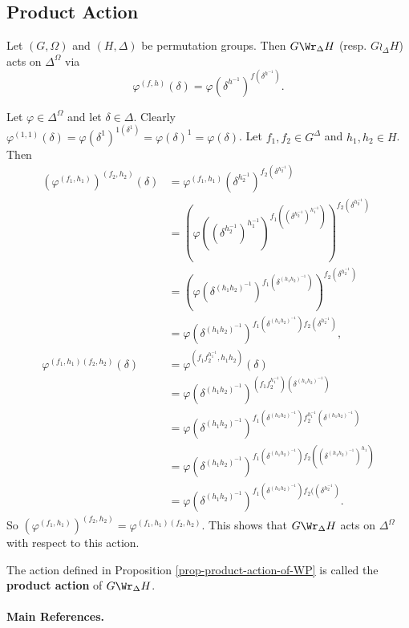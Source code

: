 \subsection{Product Action}
\begin{proposition} \label{prop-product-action-of-WP}
	Let $(G,\Omega)$ and $(H,\Delta)$ be permutation groups. Then $G\Wr_\Delta H$ (resp. $G\wr_\Delta H$) acts on $\Delta^\Omega$ via
	\begin{equation*}
	\varphi^{(f,h)}(\delta) = \varphi(\delta^{h^{-1}})^{f(\delta^{h^{-1}})}.
	\end{equation*} 
\end{proposition}
\begin{sketch}
	Let $\varphi\in \Delta^{\Omega}$ and let $\delta\in \Delta$. 
	Clearly $\varphi^{(1,1)}(\delta) = \varphi(\delta^{1})^{1(\delta^{1})} = \varphi(\delta)^{1} = \varphi(\delta)$. Let $f_1,f_2\in G^\Delta$ and $h_1,h_2\in H$. Then  
	\begin{align*}
		(\varphi^{(f_1,h_1)})^{(f_2,h_2)}(\delta) &= \varphi^{(f_1,h_1)}(\delta^{h_2^{-1}})^{f_2(\delta^{h_2^{-1}})}
		\\
		&= (\varphi((\delta^{h_2^{-1}})^{h_1^{-1}})^{f_1((\delta^{h_2^{-1}})^{h_1^{-1}})})^{f_2(\delta^{h_2^{-1}})}
		\\
		&= (\varphi(\delta^{(h_1h_2)^{-1}})^{f_1(\delta^{(h_1h_2)^{-1}})})^{f_2(\delta^{h_2^{-1}})}
		\\
		&= \varphi(\delta^{(h_1h_2)^{-1}})^{f_1(\delta^{(h_1h_2)^{-1}})f_2(\delta^{h_2^{-1}})},
		\\
\varphi^{(f_1,h_1)(f_2,h_2)}(\delta)&= \varphi^{(f_1f_2^{h_1^{-1}},h_1h_2)}(\delta)
\\
&= \varphi(\delta^{(h_1h_2)^{-1}})^{(f_1f_2^{h_1^{-1}})(\delta^{(h_1h_2)^{-1}})}
\\
&= \varphi(\delta^{(h_1h_2)^{-1}})^{f_1(\delta^{(h_1h_2)^{-1}})f_2^{h_1^{-1}}(\delta^{(h_1h_2)^{-1}})}
\\
&= \varphi(\delta^{(h_1h_2)^{-1}})^{f_1(\delta^{(h_1h_2)^{-1}})f_2((\delta^{(h_1h_2)^{-1}})^{h_1})}
\\
&= \varphi(\delta^{(h_1h_2)^{-1}})^{f_1(\delta^{(h_1h_2)^{-1}})f_2((\delta^{h_2^{-1}})}.
\end{align*}
	So $(\varphi^{(f_1,h_1)})^{(f_2,h_2)}  =\varphi^{(f_1,h_1)(f_2,h_2)}$. This shows that $G\Wr_{\Delta} H$ acts on $\Delta^\Omega$ with respect to this action.
\end{sketch}
\begin{definition}
	The action defined in Proposition \ref{prop-product-action-of-WP} is called the \textbf{product action} of $G\Wr_{\Delta} H$.
\end{definition}


\paragraph{Main References.} \cite{Meldrum1995,Praeger2018,Dixon1996}
